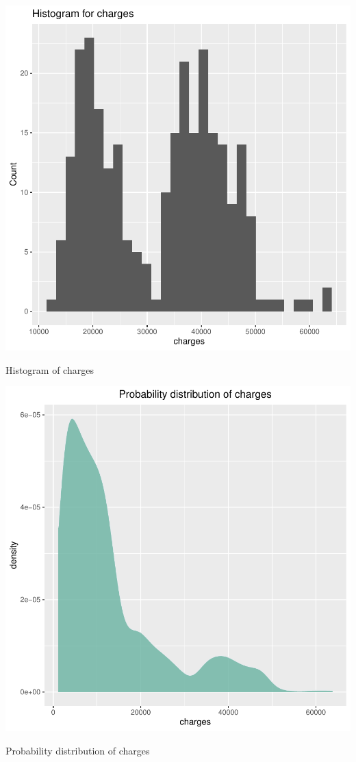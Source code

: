 \documentclass{article}
\begin{document}
\begin{centerfig}
\includegraphics{Untitled-032}
\caption{Histogram of charges}
\end{centerfig}

\begin{centerfig}
\includegraphics{Untitled-033}
\caption{Probability distribution of charges}
\end{centerfig}
\end{document}
